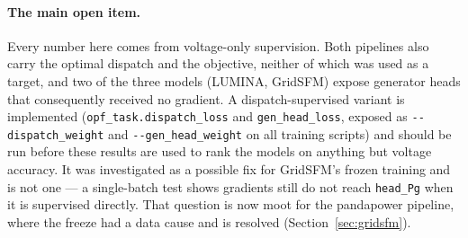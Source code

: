 \documentclass[10pt]{article}
\begin{document}
\paragraph{The main open item.} Every number here comes from voltage-only
supervision. Both pipelines also carry the optimal dispatch and the objective,
neither of which was used as a target, and two of the three models (LUMINA,
GridSFM) expose generator heads that consequently received no gradient. A
dispatch-supervised variant is implemented (\texttt{opf\_task.dispatch\_loss}
and \texttt{gen\_head\_loss}, exposed as \texttt{-{}-dispatch\_weight} and
\texttt{-{}-gen\_head\_weight} on all training scripts) and should be run before
these results are used to rank the models on anything but voltage accuracy. It
was investigated as a possible fix for GridSFM's frozen training and is not one
--- a single-batch test shows gradients still do not reach \texttt{head\_Pg} when
it is supervised directly. That question is now moot for the pandapower pipeline,
where the freeze had a data cause and is resolved (Section~\ref{sec:gridsfm}).
\end{document}
